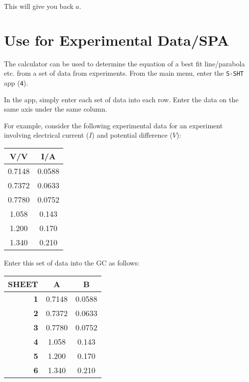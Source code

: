 \documentclass[a5paper,draft]{memoir}
\def\code#1{\texttt{#1}}
\begin{document}
This will give you back $a$.

\section{Use for Experimental Data/SPA}
The calculator can be used to determine the equation of a best fit line/parabola etc. from a set of data from experiments. From the main menu, enter the \code{S-SHT} app (\code{4}). 

In the app, simply enter each set of data into each row. Enter the data on the same axis under the same column.

For example, consider the following experimental data for an experiment involving electrical current ($I$) and potential difference ($V$): 

\begin{center}
	\setlength{\tabcolsep}{10pt}
	\renewcommand{\arraystretch}{1.2}
	\begin{tabular}{|c|c|}
		\hline
		\textbf{V/V}	& \textbf{I/A} \\
		\hline
		0.7148			& 0.0588 \\
		\hline
		0.7372			& 0.0633 \\
		\hline
		0.7780			& 0.0752 \\
		\hline
		1.058			& 0.143 \\
		\hline
		1.200			& 0.170 \\
		\hline
		1.340			& 0.210 \\
		\hline
	\end{tabular}
\end{center}

\pagebreak
Enter this set of data into the GC as follows:

\begin{center}
	\setlength{\tabcolsep}{10pt}
	\renewcommand{\arraystretch}{1.2}
	\begin{tabular}{|r|c|c|}
		\hline
		{\tiny SHEET}& \textbf{A}	& \textbf{B} \\
		\hline
		\textbf{1}	& 0.7148		& 0.0588 \\
		\hline
		\textbf{2}	& 0.7372		& 0.0633 \\
		\hline
		\textbf{3}	& 0.7780		& 0.0752 \\
		\hline
		\textbf{4}	& 1.058			& 0.143 \\
		\hline
		\textbf{5}	& 1.200			& 0.170 \\
		\hline
		\textbf{6}	& 1.340			& 0.210 \\
		\hline
	\end{tabular}
\end{center}
\end{document}
